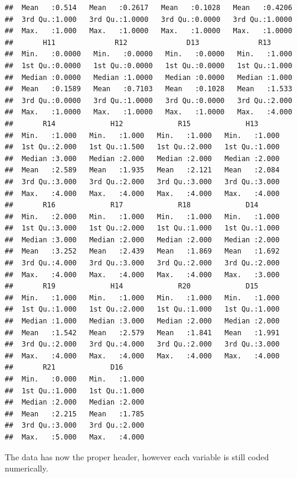 \documentclass[
]{book}
\begin{document}
\begin{verbatim}
##  Mean   :0.514   Mean   :0.2617   Mean   :0.1028   Mean   :0.4206  
##  3rd Qu.:1.000   3rd Qu.:1.0000   3rd Qu.:0.0000   3rd Qu.:1.0000  
##  Max.   :1.000   Max.   :1.0000   Max.   :1.0000   Max.   :1.0000  
##       H11              R12              D13              R13       
##  Min.   :0.0000   Min.   :0.0000   Min.   :0.0000   Min.   :1.000  
##  1st Qu.:0.0000   1st Qu.:0.0000   1st Qu.:0.0000   1st Qu.:1.000  
##  Median :0.0000   Median :1.0000   Median :0.0000   Median :1.000  
##  Mean   :0.1589   Mean   :0.7103   Mean   :0.1028   Mean   :1.533  
##  3rd Qu.:0.0000   3rd Qu.:1.0000   3rd Qu.:0.0000   3rd Qu.:2.000  
##  Max.   :1.0000   Max.   :1.0000   Max.   :1.0000   Max.   :4.000  
##       R14             H12             R15             H13       
##  Min.   :1.000   Min.   :1.000   Min.   :1.000   Min.   :1.000  
##  1st Qu.:2.000   1st Qu.:1.500   1st Qu.:2.000   1st Qu.:1.000  
##  Median :3.000   Median :2.000   Median :2.000   Median :2.000  
##  Mean   :2.589   Mean   :1.935   Mean   :2.121   Mean   :2.084  
##  3rd Qu.:3.000   3rd Qu.:2.000   3rd Qu.:3.000   3rd Qu.:3.000  
##  Max.   :4.000   Max.   :4.000   Max.   :4.000   Max.   :4.000  
##       R16             R17             R18             D14       
##  Min.   :2.000   Min.   :1.000   Min.   :1.000   Min.   :1.000  
##  1st Qu.:3.000   1st Qu.:2.000   1st Qu.:1.000   1st Qu.:1.000  
##  Median :3.000   Median :2.000   Median :2.000   Median :2.000  
##  Mean   :3.252   Mean   :2.439   Mean   :1.869   Mean   :1.692  
##  3rd Qu.:4.000   3rd Qu.:3.000   3rd Qu.:2.000   3rd Qu.:2.000  
##  Max.   :4.000   Max.   :4.000   Max.   :4.000   Max.   :3.000  
##       R19             H14             R20             D15       
##  Min.   :1.000   Min.   :1.000   Min.   :1.000   Min.   :1.000  
##  1st Qu.:1.000   1st Qu.:2.000   1st Qu.:1.000   1st Qu.:1.000  
##  Median :1.000   Median :3.000   Median :2.000   Median :2.000  
##  Mean   :1.542   Mean   :2.579   Mean   :1.841   Mean   :1.991  
##  3rd Qu.:2.000   3rd Qu.:4.000   3rd Qu.:2.000   3rd Qu.:3.000  
##  Max.   :4.000   Max.   :4.000   Max.   :4.000   Max.   :4.000  
##       R21             D16       
##  Min.   :0.000   Min.   :1.000  
##  1st Qu.:1.000   1st Qu.:1.000  
##  Median :2.000   Median :2.000  
##  Mean   :2.215   Mean   :1.785  
##  3rd Qu.:3.000   3rd Qu.:2.000  
##  Max.   :5.000   Max.   :4.000
\end{verbatim}

The data has now the proper header, however each variable is still coded numerically.
\end{document}
